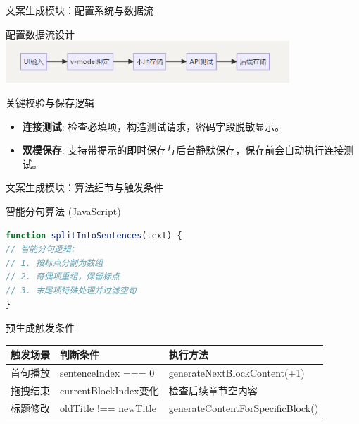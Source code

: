 \documentclass{beamer}
\begin{document}
\begin{frame}{文案生成模块：配置系统与数据流}
    \begin{block}{配置数据流设计}
        \centering
        \includegraphics[width=0.8\textwidth]{pic/copywriting_flow.png}
    \end{block}
    \begin{exampleblock}{关键校验与保存逻辑}
        \begin{itemize}
            \item \textbf{连接测试}: 检查必填项，构造测试请求，密码字段脱敏显示。
            \item \textbf{双模保存}: 支持带提示的即时保存与后台静默保存，保存前会自动执行连接测试。
        \end{itemize}
    \end{exampleblock}
\end{frame}

\begin{frame}[fragile]{文案生成模块：算法细节与触发条件}
    \begin{block}{智能分句算法 (JavaScript)}
        \begin{lstlisting}[language=JavaScript]
function splitIntoSentences(text) {
// 智能分句逻辑:
// 1. 按标点分割为数组
// 2. 奇偶项重组，保留标点
// 3. 末尾项特殊处理并过滤空句
}
\end{lstlisting}
    \end{block}
    \begin{block}{预生成触发条件}
        \centering
        \small
        \begin{tabular}{|l|l|l|}
            \hline
            \textbf{触发场景} & \textbf{判断条件}         & \textbf{执行方法}                     \\ %
            \hline
            首句播放          & sentenceIndex === 0   & generateNextBlockContent(+1)      \\ %
            拖拽结束          & currentBlockIndex变化   & 检查后续章节空内容                         \\ %
            标题修改          & oldTitle !== newTitle & generateContentForSpecificBlock() \\ %
            \hline
        \end{tabular}
    \end{block}
\end{frame}
\end{document}
